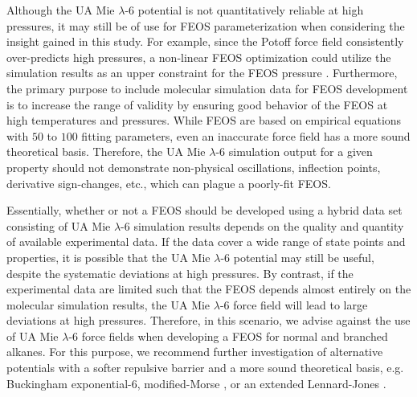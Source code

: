 \documentclass[preprint,letterpaper,floatfix,citeautoscript,aip,jcp]{revtex4-1}
\begin{document}
Although the UA Mie $\lambda$-6 potential is not quantitatively reliable at high pressures, it may still be of use for FEOS parameterization when considering the insight gained in this study. For example, since the Potoff force field consistently over-predicts high pressures, a non-linear FEOS optimization could utilize the simulation results as an upper constraint for the FEOS pressure \cite{Thol_LJTS}. Furthermore, the primary purpose to include molecular simulation data for FEOS development is to increase the range of validity by ensuring good behavior of the FEOS at high temperatures and pressures. While FEOS are based on empirical equations with $50$ to $100$ fitting parameters, even an inaccurate force field has a more sound theoretical basis. Therefore, the UA Mie $\lambda$-6 simulation output for a given property should not demonstrate non-physical oscillations, inflection points, derivative sign-changes, etc., which can plague a poorly-fit FEOS.

%
%
%
%


Essentially, whether or not a FEOS should be developed using a hybrid data set consisting of UA Mie $\lambda$-6 simulation results depends on the quality and quantity of available experimental data. If the data cover a wide range of state points and properties, it is possible that the UA Mie $\lambda$-6 potential may still be useful, despite the systematic deviations at high pressures. By contrast, if the experimental data are limited such that the FEOS depends almost entirely on the molecular simulation results, the UA Mie $\lambda$-6 force field will lead to large deviations at high pressures. Therefore, in this scenario, we advise against the use of UA Mie $\lambda$-6 force fields when developing a FEOS for normal and branched alkanes. For this purpose, 
we recommend further investigation of alternative potentials with a softer repulsive barrier and a more sound theoretical basis, e.g. Buckingham exponential-6, modified-Morse \cite{Rowley1999,Rowley2001,Hayes2004}, or an extended Lennard-Jones \cite{Mostafa_Diss,Hajigeorgiou2016,Kalos1972}.
\end{document}
